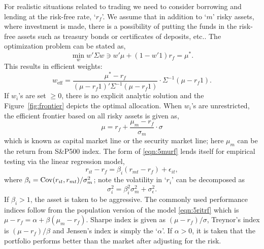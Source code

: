 For realistic situations related to trading we need to consider borrowing and lending at the risk-free rate, `$r_f$'. We assume that in addition to `$m$' risky assets, where investment is made, there is a possibility of putting the funds in the risk-free assets such as treasury bonds or certificates of deposits, etc.. The optimization problem can be stated as,
	\begin{equation} \label{eqn:5min2}
	\min_w w' \Sigma w \ni w' \mu + (1 - w' 1) r_f = \mu^*.
	\end{equation}
This results in efficient weights:
	\begin{equation} \label{eqn:5weff2}
	w_{\text{eff}}= \dfrac{\mu^* - r_f}{(\mu - r_f1)' \Sigma^{-1}(\mu - r_f 1)} \cdot \Sigma^{-1}(\mu - r_f 1).
	\end{equation}
If $w_i$'s are set $\geq 0$, there is no explicit analytic solution and the Figure~\ref{fig:frontier} depicts the optimal allocation. When $w_i$'s are unrestricted, the efficient frontier based on all risky assets is given as, 
	\begin{equation} \label{eqn:5murf}
	\mu= r_f + \dfrac{\mu_m - r_f}{\sigma_m} \cdot \sigma
	\end{equation}
which is known as capital market line or the security market line; here $\mu_m$ can be the return from S\&P500 index. The form of \eqref{eqn:5murf} lends itself for empirical testing via the linear regression model,
	\begin{equation} \label{eqn:5ritrf}
	r_{it} - r_f = \beta_i (r_{mt} - r_f) + \epsilon_{it},
	\end{equation}
where $\beta_i= \operatorname{Cov}(r_{it} ,r_{mt})/\sigma_m^2$; note the volatility in `$r_i$' can be decomposed as 
	\begin{equation} \label{eqn:5sigsq}
	\sigma_i^2= \beta_i^2 \sigma_m^2 + \sigma_\epsilon^2.
	\end{equation}
If $\beta_i > 1$, the asset is taken to be aggressive. The commonly used performance indices follow from the population version of the model \eqref{eqn:5ritrf} which is $\mu - r_f = \alpha + \beta(\mu_m - r_f)$. Sharpe index is given as $(\mu - r_f)/\sigma$, Treynor's index is $(\mu - r_f)/\beta$ and Jensen's index is simply the `$\alpha$'. If $\alpha > 0$, it is taken that the portfolio performs better than the market after adjusting for the risk. 


